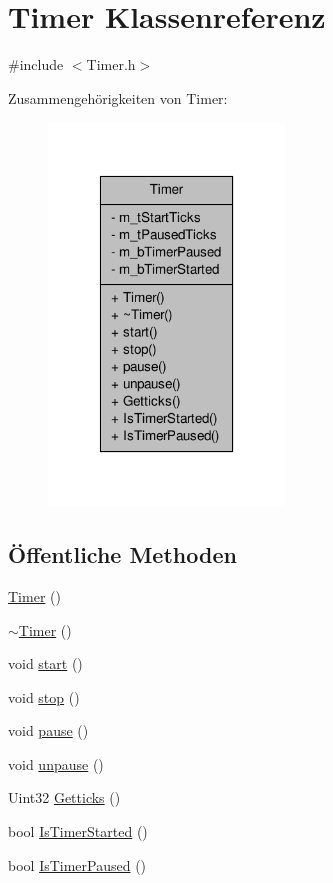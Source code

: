 \hypertarget{class_timer}{\section{Timer Klassenreferenz}
\label{class_timer}
}


{\ttfamily \#include $<$Timer.\-h$>$}



Zusammengehörigkeiten von Timer\-:
\nopagebreak
\begin{figure}[H]
\begin{center}
\leavevmode
\includegraphics[width=178pt]{class_timer__coll__graph}
\end{center}
\end{figure}
\subsection*{Öffentliche Methoden}
\begin{DoxyCompactItemize}
\item 
\hyperlink{class_timer_a5f16e8da27d2a5a5242dead46de05d97}{Timer} ()
\item 
\hyperlink{class_timer_a14fa469c4c295c5fa6e66a4ad1092146}{$\sim$\-Timer} ()
\item 
void \hyperlink{class_timer_a3a8b5272198d029779dc9302a54305a8}{start} ()
\item 
void \hyperlink{class_timer_a63f0eb44b27402196590a03781515dba}{stop} ()
\item 
void \hyperlink{class_timer_a0289effad7b573c508bc27e405900a23}{pause} ()
\item 
void \hyperlink{class_timer_aa4dd50d7ed48ac73efed2950749d35d6}{unpause} ()
\item 
Uint32 \hyperlink{class_timer_a419af9cdb3d77331954a78a9c877de11}{Getticks} ()
\item 
bool \hyperlink{class_timer_a6bbccc880351d19cedc6686b8a502127}{Is\-Timer\-Started} ()
\item 
bool \hyperlink{class_timer_addc24cd782c4d73db0a929894960ccf2}{Is\-Timer\-Paused} ()
\end{DoxyCompactItemize}
